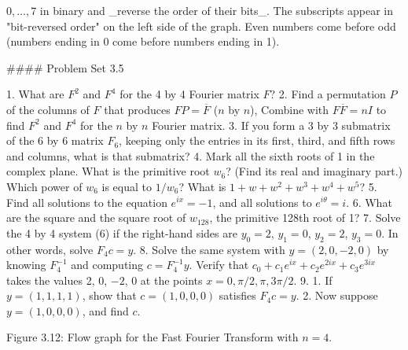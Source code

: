 \(0,\ldots,7\) in binary and _reverse the order of their bits_. The subscripts appear in "bit-reversed order" on the left side of the graph. Even numbers come before odd (numbers ending in 0 come before numbers ending in 1).

#### Problem Set 3.5

1. What are \(F^{2}\) and \(F^{4}\) for the 4 by 4 Fourier matrix \(F\)?
2. Find a permutation \(P\) of the columns of \(F\) that produces \(FP=\overline{F}\) (\(n\) by \(n\)), Combine with \(F\overline{F}=nI\) to find \(F^{2}\) and \(F^{4}\) for the \(n\) by \(n\) Fourier matrix.
3. If you form a 3 by 3 submatrix of the 6 by 6 matrix \(F_{6}\), keeping only the entries in its first, third, and fifth rows and columns, what is that submatrix?
4. Mark all the sixth roots of 1 in the complex plane. What is the primitive root \(w_{6}\)? (Find its real and imaginary part.) Which power of \(w_{6}\) is equal to \(1/w_{6}\)? What is \(1+w+w^{2}+w^{3}+w^{4}+w^{5}\)?
5. Find all solutions to the equation \(e^{ix}=-1\), and all solutions to \(e^{i\theta}=i\).
6. What are the square and the square root of \(w_{128}\), the primitive 128th root of 1?
7. Solve the 4 by 4 system (6) if the right-hand sides are \(y_{0}=2\), \(y_{1}=0\), \(y_{2}=2\), \(y_{3}=0\). In other words, solve \(F_{4}c=y\).
8. Solve the same system with \(y=(2,0,-2,0)\) by knowing \(F_{4}^{-1}\) and computing \(c=F_{4}^{-1}y\). Verify that \(c_{0}+c_{1}e^{ix}+c_{2}e^{2ix}+c_{3}e^{3ix}\) takes the values 2, 0, \(-2\), 0 at the points \(x=0,\pi/2,\pi,3\pi/2\).
9. 1. If \(y=(1,1,1,1)\), show that \(c=(1,0,0,0)\) satisfies \(F_{4}c=y\). 2. Now suppose \(y=(1,0,0,0)\), and find \(c\).

Figure 3.12: Flow graph for the Fast Fourier Transform with \(n=4\).

 